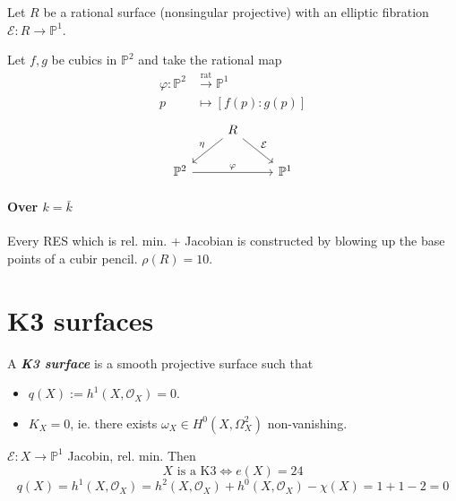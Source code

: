 \begin{defn}
	Let $R$ be a rational surface (nonsingular projective) with an elliptic fibration $\mathcal{E}:R\to \mathbb{P}^1$.
\end{defn}

\begin{example}
	Let $f,g$ be cubics in  $\mathbb{P}^2$ and take the rational map
	\begin{align*}
		\varphi: \mathbb{P}^2 &\overset{\operatorname{rat}}{\longrightarrow} \mathbb{P}^1 \\
		p &\longmapsto [f(p):g(p)]
	\end{align*}
	\[\begin{tikzcd}
	&R\arrow[dl,"\eta",swap]\arrow[dr,"\mathcal{E}"]\\
	\mathbb{P}^2\arrow[rr,"\varphi"]&&\mathbb{P}^1
	\end{tikzcd}\]
\end{example}

\paragraph{Over $k=\bar{k}$} Every RES which is rel. min. + Jacobian is constructed by blowing up the base points of a cubir pencil. $\rho(R)=10$.

\section{K3 surfaces}

\begin{defn}
	A \textit{\textbf{K3 surface}} is a smooth projective surface such that
	\begin{itemize}
	\item $q(X):=h^1(X,\mathcal{O}_X)=0$.

	\item $K_X=0$, ie. there exists  $\omega_X\in H^{0}(X,\Omega^2_X)$ non-vanishing.
	\end{itemize}
\end{defn}

\begin{prop}
	$\mathcal{E}:X\to \mathbb{P}^1$ Jacobin, rel. min. Then
	\[X \text{ is a K3}\iff e(X)=24 \]
	\[q(X)= h^{1}(X,\mathcal{O}_X)=h^{2}(X,\mathcal{O}_X)+h^{0}(X,\mathcal{O}_X)-\chi(X)=1+1-2=0\]
\end{prop}

